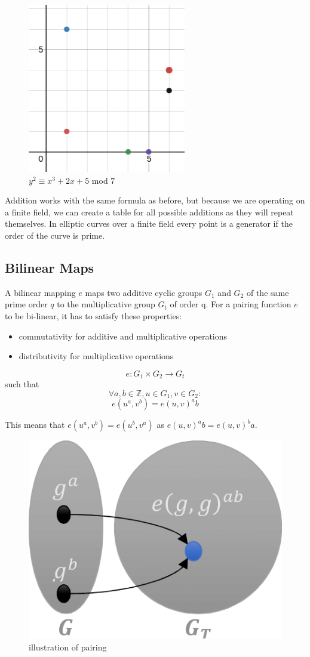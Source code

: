 \documentclass[a4paper,12pt]{scrartcl}
\begin{document}
\begin{figure}[hbt!]
	\centering
	\includegraphics[width=0.5\linewidth]{ec3}
	\caption{$y^2 \equiv x^3 + 2x + 5$ mod $7$}
\end{figure}

Addition works with the same formula as before, but because we are operating on a finite field, we can create a table for all possible additions as they will repeat themselves. In elliptic curves over a finite field every point is a generator if the order of the curve is prime.

\subsection{Bilinear Maps}
A bilinear mapping $e$ maps two additive cyclic groups $G_1$ and $G_2$ of the same prime order $q$ to the multiplicative group $G_t$ of order q. For a pairing function $e$ to be bi-linear, it has to satisfy these properties:
\begin{itemize}
	\item commutativity for additive and multiplicative operations
	\item distributivity for multiplicative operations
\end{itemize}
\[ e: G_1 \times G_2 \rightarrow G_t \]
such that
\[ \forall a,b \in \mathbb{Z}, u \in G_1, v \in G_2: \]
\[ e(u^a,v^b) = e(u,v)^ab \]

This means that $e(u^a,v^b) = e(u^b,v^a)$ as $e(u,v)^ab = e(u,v)^ba$.

\begin{figure}[hbt!]
	\centering
	\includegraphics[width=0.5\linewidth]{pairing1}
	\caption{illustration of pairing}
\end{figure}
\end{document}
